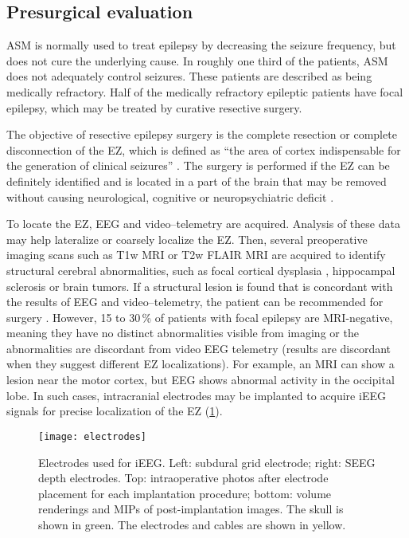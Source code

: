 \subsection{Presurgical evaluation}

\Ac{ASM} is normally used to treat epilepsy by decreasing the seizure frequency, but does not cure the underlying cause.
In roughly one third of the patients, \ac{ASM} does not adequately control seizures.
These patients are described as being medically refractory.
Half of the medically refractory epileptic patients have focal epilepsy, which may be treated by curative resective surgery.

The objective of resective epilepsy surgery is the complete resection or complete disconnection of the \ac{EZ}, which is defined as ``the area of cortex indispensable for the generation of clinical seizures'' \cite{rosenow_presurgical_2001}.
The surgery is performed if the \ac{EZ} can be definitely identified and is located in a part of the brain that may be removed without causing neurological, cognitive or neuropsychiatric deficit \cite{jobst_resective_2015}.

To locate the \ac{EZ}, \ac{EEG} and video--telemetry are acquired.
Analysis of these data may help lateralize or coarsely localize the \ac{EZ}.
Then, several preoperative imaging scans such as \ac{T1w} \ac{MRI} or \ac{T2w} \ac{FLAIR} \ac{MRI} are acquired to identify structural cerebral abnormalities, such as focal cortical dysplasia \cite{kabat_focal_2012}, hippocampal sclerosis \cite{thom_review_2014} or brain tumors.
If a structural lesion is found that is concordant with the results of \ac{EEG} and video--telemetry, the patient can be recommended for surgery \cite{duncan_brain_2016}.
However, 15 to 30\,\% of patients with focal epilepsy are \ac{MRI}-negative, meaning they have no distinct abnormalities visible from imaging or the abnormalities are discordant from video \ac{EEG} telemetry \cite{bien_characteristics_2009} (results are discordant when they suggest different \ac{EZ} localizations).
For example, an \ac{MRI} can show a lesion near the motor cortex, but \ac{EEG} shows abnormal activity in the occipital lobe.
In such cases, intracranial electrodes may be implanted to acquire \ac{iEEG} signals for precise localization of the \ac{EZ} (\cref{fig:electrodes}).

\begin{figure}[hbt!]
  \centering
  \texttt{[image: electrodes]}
  \caption[Electrodes used for intracranial EEG]{
    Electrodes used for \acf{iEEG}.
    Left: subdural grid electrode;
    right: \acf{SEEG} depth electrodes.
    Top: intraoperative photos after electrode placement for each implantation procedure;
    bottom: volume renderings and \acfp{MIP} of post-implantation images.
    The skull is shown in green.
    The electrodes and cables are shown in yellow.
  }\label{fig:electrodes}
\end{figure}

